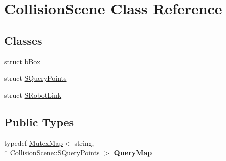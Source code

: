 \hypertarget{classCollisionScene}{\section{Collision\-Scene Class Reference}
\label{classCollisionScene}
}
\subsection*{Classes}
\begin{DoxyCompactItemize}
\item 
struct \hyperlink{structCollisionScene_1_1bBox}{b\-Box}
\item 
struct \hyperlink{structCollisionScene_1_1SQueryPoints}{S\-Query\-Points}
\item 
struct \hyperlink{structCollisionScene_1_1SRobotLink}{S\-Robot\-Link}
\end{DoxyCompactItemize}
\subsection*{Public Types}
\begin{DoxyCompactItemize}
\item 
\hypertarget{classCollisionScene_aa0b9e7bae731b946f0e049b4591bbaf4}{typedef \hyperlink{classMutexMap}{Mutex\-Map}$<$ string, \\*
\hyperlink{structCollisionScene_1_1SQueryPoints}{Collision\-Scene\-::\-S\-Query\-Points} $>$ {\bfseries Query\-Map}}\label{classCollisionScene_aa0b9e7bae731b946f0e049b4591bbaf4}

\end{DoxyCompactItemize}
